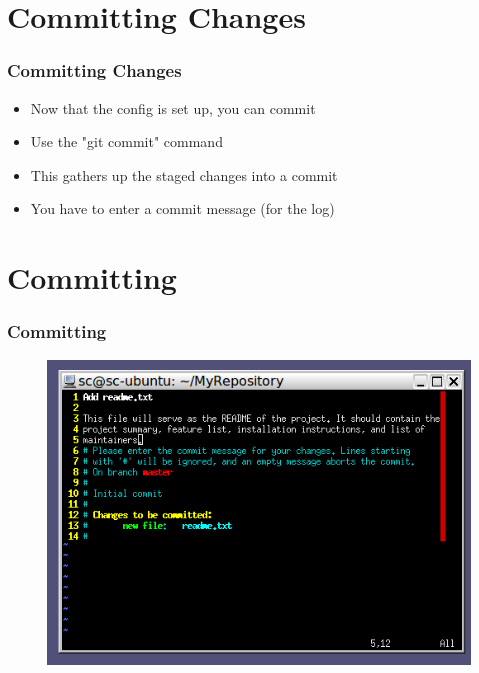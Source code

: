 \documentclass{beamer}
\begin{document}
\section{Committing Changes}
\begin{frame}
\frametitle{Committing Changes}
\begin{itemize}
\item Now that the config is set up, you can commit
\item Use the "git commit" command
\item This gathers up the staged changes into a commit
\item You have to enter a commit message (for the log)
\end{itemize}
\begin{figure}
\end{figure}
\end{frame}

\section{Committing}
\begin{frame}
\frametitle{Committing}
\begin{figure}
\includegraphics[scale=0.5]{committing}
\end{figure}
\end{frame}
\end{document}
